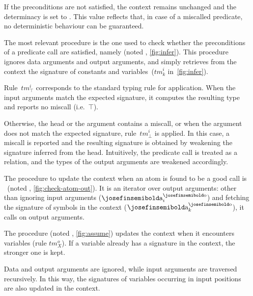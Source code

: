 If the preconditions are not satisfied, the context remains unchanged
and the determinacy is set to \relI. This value reflects that, in case
of a miscalled predicate, no deterministic behaviour can be guaranteed.

The most relevant procedure is the one used to check whether the
preconditions of a predicate call are satisfied, namely \checkai
(noted \inferInfix, \cref{fig:infer}). This procedure ignores data arguments and output
arguments, and simply retrieves from the context the signature of
constants and variables~($tm_k^i$ in~\cref{fig:infer}).

Rule~$tm_\top^i$ corresponds to the standard typing rule for
application. When the input arguments match the expected signature, it
computes the resulting type and reports no miscall (i.e.\ $\top$).

Otherwise, the head or the argument contains a miscall, 
or when the argument does not match the expected signature,
rule~$tm_\bot^i$ is applied. In this case, a miscall is reported and the
resulting signature is obtained by weakening the signature inferred from the
head. Intuitively, the predicate call is treated as a relation, and the
types of the output arguments are weakened accordingly.


The procedure to update the context when an atom is found to be
a good call is \checkao~(noted \checkaoInfix, \cref{fig:check-atom-out}). %
It is an iterator over output arguments:
other than ignoring input arguments ($\text{\procfont a}_i^\text{\procfont o}$)
and fetching the signature of symbols
in the context ($\text{\procfont a}_k^\text{\procfont o}$),
it calls \assume on output arguments.

The \assume procedure (noted \assumeInfix, \cref{fig:assume}) updates the context when it
encounters variables (rule $tm_X^o$). If a variable already has a
signature in the context, the stronger one is kept.

Data and output arguments are ignored, while input arguments are
traversed recursively. In this way, the signatures of variables
occurring in input positions are also updated in the context.


